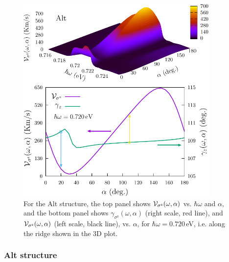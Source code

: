 \documentclass[floatfix,prb,aps,superscriptaddress,showpacs,11pt,preprint,letterpaper]{revtex4}
\def\tama{10cm}
\begin{document}
\begin{figure}[tb]
\centering
\includegraphics[width=\tama]{figures/fig6}
\caption{For the Alt structure, the top panel shows ${\cal
V}_{\sigma^\mathrm{z}} (\omega,\alpha)$ vs. $\hbar\omega$ and $\alpha$, and the
bottom panel shows $\gamma_{\sigma^\mathrm{z}} (\omega,\alpha)$ (right scale,
red line), and ${\cal V}_{\sigma^\mathrm{z}} (\omega,\alpha)$ (left scale, black
line), vs. $\alpha$, for $\hbar\omega=0.720$\,eV, i.e. along the ridge shown in
the 3D plot.}
\label{fig:alt-vsz}
\end{figure}

\subsubsection{Alt structure}
\end{document}
